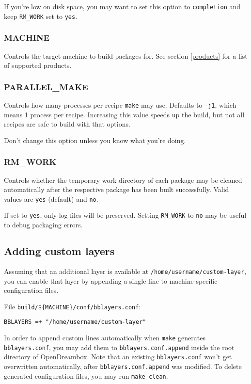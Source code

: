 \documentclass[a4paper]{article}
\newcommand{\shell}[1]{\texttt{\small #1}}
\begin{document}
      If you're low on disk space, you may want to set this option to
      \shell{completion} and keep \shell{RM\_WORK} set to \shell{yes}.

    \subsubsection{MACHINE}
      Controls the target machine to build packages for. See section \ref{products}
      for a list of supported products.

    \subsubsection{PARALLEL\_MAKE}
      Controls how many processes per recipe \shell{make} may use. Defaults to
      \shell{-j1}, which means 1 process per recipe. Increasing this value speeds
      up the build, but not all recipes are safe to build with that options.

      Don't change this option unless you know what you're doing.

    \subsubsection{RM\_WORK}
      Controls whether the temporary work directory of each package may be
      cleaned automatically after the respective package has been built
      successfully. Valid values are \shell{yes} (default) and \shell{no}.

      If set to \shell{yes}, only log files will be preserved. Setting
      \shell{RM\_WORK} to \shell{no} may be useful to debug packaging errors.

  \subsection{Adding custom layers}
  \label{custom_layers}
     Assuming that an additional layer is available at \shell{/home/username/custom-layer},
     you can enable that layer by appending a single line to machine-specific configuration
     files.

     File \shell{build/\$\{MACHINE\}/conf/bblayers.conf}:

     \shell{BBLAYERS =+ "/home/username/custom-layer"}

     In order to append custom lines automatically when \shell{make} generates
     \shell{bblayers.conf}, you may add them to \shell{bblayers.conf.append}
     inside the root directory of OpenDreambox. Note that an existing \shell{bblayers.conf}
     won't get overwritten automatically, after \shell{bblayers.conf.append}
     was modified. To delete generated configuration files, you may run \shell{make clean}.
\end{document}
